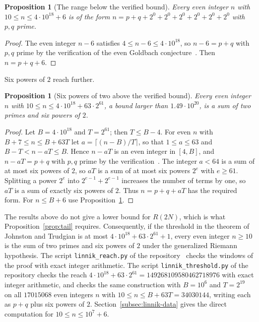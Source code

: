 \documentclass[11pt]{amsart}
\newtheorem{Proposition}[Theorem]{Proposition}
\theoremstyle{definition}
\theoremstyle{remark}
\begin{document}
\begin{Proposition}[The range below the verified bound]\label{prop:six-powers}
Every even integer $n$ with $10\leq n\leq 4\cdot 10^{18}+6$ is of the form $n=p+q+2^{0}+2^{0}+2^{0}+2^{0}+2^{0}+2^{0}$ with $p,q$ prime.
\end{Proposition}
\begin{proof}
The even integer $n-6$ satisfies $4\leq n-6\leq 4\cdot 10^{18}$, so $n-6=p+q$ with $p,q$ prime by the verification of the even Goldbach conjecture~\cite{oliveira2014empirical}. Then $n=p+q+6$.
\end{proof}
Six powers of $2$ reach further.
\begin{Proposition}[Six powers of two above the verified bound]\label{prop:six-powers-ext}
Every even integer $n$ with $10\leq n\leq 4\cdot 10^{18}+63\cdot 2^{61}$, a bound larger than $1.49\cdot 10^{20}$, is a sum of two primes and six powers of $2$.
\end{Proposition}
\begin{proof}
Let $B=4\cdot 10^{18}$ and $T=2^{61}$; then $T\leq B-4$. For even $n$ with $B+7\leq n\leq B+63T$ let $a=\lceil (n-B)/T\rceil$, so that $1\leq a\leq 63$ and $B-T<n-aT\leq B$. Hence $n-aT$ is an even integer in $[4,B]$, and $n-aT=p+q$ with $p,q$ prime by the verification~\cite{oliveira2014empirical}. The integer $a<64$ is a sum of at most six powers of $2$, so $aT$ is a sum of at most six powers $2^e$ with $e\geq 61$. Splitting a power $2^e$ into $2^{e-1}+2^{e-1}$ increases the number of terms by one, so $aT$ is a sum of exactly six powers of $2$. Thus $n=p+q+aT$ has the required form. For $n\leq B+6$ use Proposition~\ref{prop:six-powers}.
\end{proof}
The results above do not give a lower bound for $R(2N)$, which is what Proposition~\ref{prop:tail} requires. Consequently, if the threshold in the theorem of Johnston and Trudgian is at most $4\cdot 10^{18}+63\cdot 2^{61}+1$, every even integer $n\geq 10$ is the sum of two primes and six powers of $2$ under the generalized Riemann hypothesis. The script \texttt{linnik\_reach.py} of the repository~\cite{vega2026pigeonlean} checks the windows of the proof with exact integer arithmetic. The script \texttt{linnik\_threshold.py} of the repository checks the reach $4\cdot 10^{18}+63\cdot 2^{61}=149268109580462718976$ with exact integer arithmetic, and checks the same construction with $B=10^6$ and $T=2^{19}$ on all $17015068$ even integers $n$ with $10\leq n\leq B+63T=34030144$, writing each as $p+q$ plus six powers of $2$. Section~\ref{subsec:linnik-data} gives the direct computation for $10\leq n\leq 10^7+6$.
\end{document}
